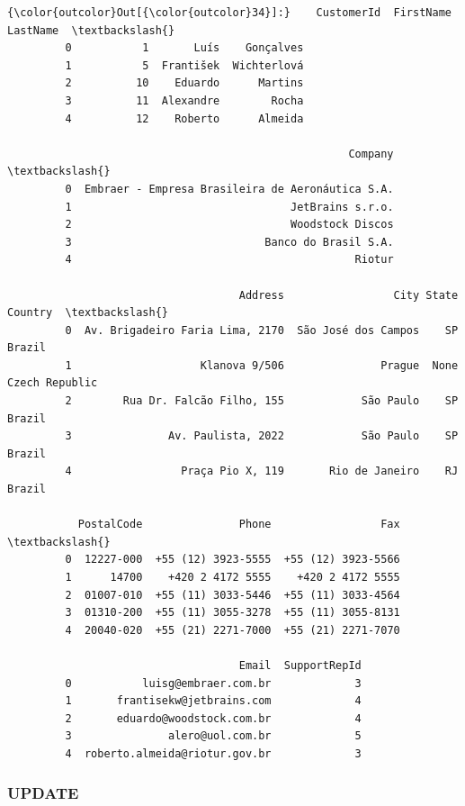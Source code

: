 \documentclass[11pt]{article}
\begin{document}
\begin{Verbatim}[commandchars=\\\{\}]
{\color{outcolor}Out[{\color{outcolor}34}]:}    CustomerId  FirstName     LastName  \textbackslash{}
         0           1       Luís    Gonçalves   
         1           5  František  Wichterlová   
         2          10    Eduardo      Martins   
         3          11  Alexandre        Rocha   
         4          12    Roberto      Almeida   
         
                                                     Company  \textbackslash{}
         0  Embraer - Empresa Brasileira de Aeronáutica S.A.   
         1                                  JetBrains s.r.o.   
         2                                  Woodstock Discos   
         3                              Banco do Brasil S.A.   
         4                                            Riotur   
         
                                    Address                 City State         Country  \textbackslash{}
         0  Av. Brigadeiro Faria Lima, 2170  São José dos Campos    SP          Brazil   
         1                    Klanova 9/506               Prague  None  Czech Republic   
         2        Rua Dr. Falcão Filho, 155            São Paulo    SP          Brazil   
         3               Av. Paulista, 2022            São Paulo    SP          Brazil   
         4                 Praça Pio X, 119       Rio de Janeiro    RJ          Brazil   
         
           PostalCode               Phone                 Fax  \textbackslash{}
         0  12227-000  +55 (12) 3923-5555  +55 (12) 3923-5566   
         1      14700    +420 2 4172 5555    +420 2 4172 5555   
         2  01007-010  +55 (11) 3033-5446  +55 (11) 3033-4564   
         3  01310-200  +55 (11) 3055-3278  +55 (11) 3055-8131   
         4  20040-020  +55 (21) 2271-7000  +55 (21) 2271-7070   
         
                                    Email  SupportRepId  
         0           luisg@embraer.com.br             3  
         1       frantisekw@jetbrains.com             4  
         2       eduardo@woodstock.com.br             4  
         3               alero@uol.com.br             5  
         4  roberto.almeida@riotur.gov.br             3  
\end{Verbatim}
            
    \hypertarget{update}{%
\subsubsection{UPDATE}\label{update}}
\end{document}
